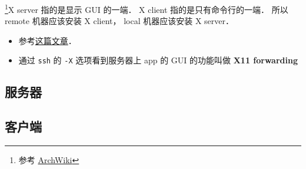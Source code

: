 
\begin{issues}
\issueDraft
\end{issues}

\footnote{参考 \href{https://wiki.archlinux.org/title/xorg}{ArchWiki}}X server 指的是显示 GUI 的一端． X client 指的是只有命令行的一端． 所以 remote 机器应该安装 X client， local 机器应该安装 X server．

\begin{itemize}
\item 参考\href{https://ostechnix.com/how-to-configure-x11-forwarding-using-ssh-in-linux/}{这篇文章}．
\item 通过 \verb|ssh| 的 \verb|-X| 选项看到服务器上 app 的 GUI 的功能叫做 \textbf{X11 forwarding}
\end{itemize}


\subsection{服务器}

\subsection{客户端}
